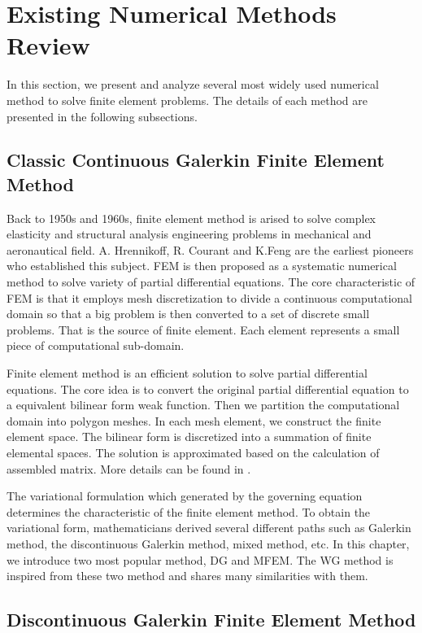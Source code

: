 \section{Existing Numerical Methods Review}
In this section, we present and analyze several most widely used numerical method to solve finite element problems. The details of each method are presented in the following subsections. 
\subsection{Classic Continuous Galerkin Finite Element Method}
Back to 1950s and 1960s, finite element method is arised to solve complex elasticity and structural analysis engineering problems in mechanical and aeronautical field. A. Hrennikoff\cite{hrennikoff1941solution}, R. Courant\cite{courant1994variational} and K.Feng are the earliest pioneers who established this subject. FEM is then proposed as a systematic numerical method to solve variety of partial differential equations. The core characteristic of FEM is that it employs mesh discretization to divide a continuous computational domain so that a big problem is then converted to a set of discrete small problems. That is the source of finite element. Each element represents a small piece of computational sub-domain.

Finite element method is an efficient solution to solve partial differential equations. The core idea is to convert the original partial differential equation to a equivalent bilinear form weak function. Then we partition the computational domain into polygon meshes. In each mesh element, we construct the finite element space. The bilinear form is discretized into a summation of finite elemental spaces. The solution is approximated based on the calculation of assembled matrix. More details can be found in \cite{zienkiewicz1977finite, ciarlet2002finite, hughes2012finite, reddy1993introduction}.

The variational formulation which generated by the governing equation determines the characteristic of the finite element method. To obtain the variational form, mathematicians derived several different paths such as Galerkin method, the discontinuous Galerkin method, mixed method, etc. In this chapter, we introduce two most popular method, DG and MFEM. The WG method is inspired from these two method and shares many similarities with them. 

\subsection{Discontinuous Galerkin Finite Element Method}

